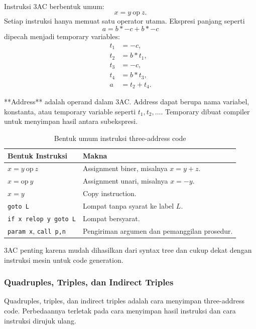 Instruksi 3AC berbentuk umum:
\[
    x = y\ \text{op}\ z.
\]
Setiap instruksi hanya memuat satu operator utama. Ekspresi panjang seperti
\[
    a = b * -c + b * -c
\]
dipecah menjadi temporary variables:
\[
\begin{aligned}
    t_1 &= -c,\\
    t_2 &= b * t_1,\\
    t_3 &= -c,\\
    t_4 &= b * t_3,\\
    a &= t_2 + t_4.
\end{aligned}
\]

**Address** adalah operand dalam 3AC. Address dapat berupa nama variabel, konstanta, atau temporary variable seperti $t_1,t_2,\ldots$. Temporary dibuat compiler untuk menyimpan hasil antara subekspresi.

\begin{table}[H]
\centering
\begin{tabularx}{\textwidth}{|L{0.30\textwidth}|X|}
\hline
\textbf{Bentuk Instruksi} & \textbf{Makna} \\
\hline
$x=y\ \text{op}\ z$ & Assignment biner, misalnya $x=y+z$. \\
\hline
$x=\text{op}\ y$ & Assignment unari, misalnya $x=-y$. \\
\hline
$x=y$ & Copy instruction. \\
\hline
\texttt{goto L} & Lompat tanpa syarat ke label $L$. \\
\hline
\texttt{if x relop y goto L} & Lompat bersyarat. \\
\hline
\texttt{param x}, \texttt{call p,n} & Pengiriman argumen dan pemanggilan prosedur. \\
\hline
\end{tabularx}
\caption{Bentuk umum instruksi three-address code}
\label{tab:bentuk-3ac}
\end{table}

3AC penting karena mudah dihasilkan dari syntax tree dan cukup dekat dengan instruksi mesin untuk code generation.

\subsubsection{Quadruples, Triples, dan Indirect Triples}

\begin{jawab}
Quadruples, triples, dan indirect triples adalah cara menyimpan three-address code. Perbedaannya terletak pada cara menyimpan hasil instruksi dan cara instruksi dirujuk ulang.
\end{jawab}

